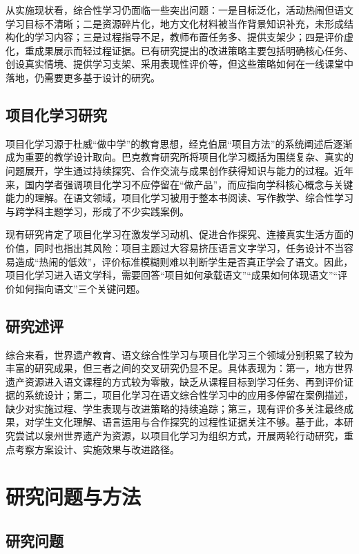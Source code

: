 从实施现状看，综合性学习仍面临一些突出问题：一是目标泛化，活动热闹但语文学习目标不清晰；二是资源碎片化，地方文化材料被当作背景知识补充，未形成结构化的学习内容；三是过程指导不足，教师布置任务多、提供支架少；四是评价虚化，重成果展示而轻过程证据。已有研究提出的改进策略主要包括明确核心任务、创设真实情境、提供学习支架、采用表现性评价等，但这些策略如何在一线课堂中落地，仍需要更多基于设计的研究。

\subsection{项目化学习研究}

项目化学习源于杜威“做中学”的教育思想，经克伯屈“项目方法”的系统阐述后逐渐成为重要的教学设计取向\cite{kilpatrick1918}。巴克教育研究所将项目化学习概括为围绕复杂、真实的问题展开，学生通过持续探究、合作交流与成果创作获得知识与能力的过程\cite{buck2008}。近年来，国内学者强调项目化学习不应停留在“做产品”，而应指向学科核心概念与关键能力的理解\cite{xiaxuemei2020}。在语文领域，项目化学习被用于整本书阅读、写作教学、综合性学习与跨学科主题学习，形成了不少实践案例。

现有研究肯定了项目化学习在激发学习动机、促进合作探究、连接真实生活方面的价值，同时也指出其风险：项目主题过大容易挤压语言文字学习，任务设计不当容易造成“热闹的低效”，评价标准模糊则难以判断学生是否真正学会了语文。因此，项目化学习进入语文学科，需要回答“项目如何承载语文”“成果如何体现语文”“评价如何指向语文”三个关键问题。

\subsection{研究述评}

综合来看，世界遗产教育、语文综合性学习与项目化学习三个领域分别积累了较为丰富的研究成果，但三者之间的交叉研究仍显不足。具体表现为：第一，地方世界遗产资源进入语文课程的方式较为零散，缺乏从课程目标到学习任务、再到评价证据的系统设计；第二，项目化学习在语文综合性学习中的应用多停留在案例描述，缺少对实施过程、学生表现与改进策略的持续追踪；第三，现有评价多关注最终成果，对学生文化理解、语言运用与合作探究的过程性证据关注不够。基于此，本研究尝试以泉州世界遗产为资源，以项目化学习为组织方式，开展两轮行动研究，重点考察方案设计、实施效果与改进路径。

\section{研究问题与方法}

\subsection{研究问题}

